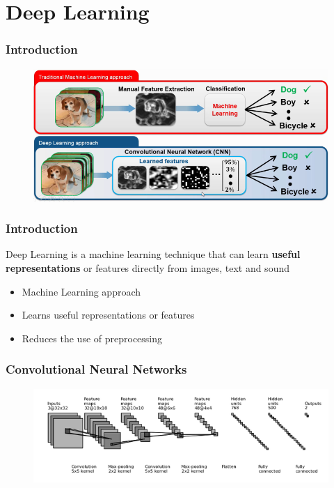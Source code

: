\documentclass[aspectratio=169]{beamer}
\begin{document}
	\section{Deep Learning}
		\begin{frame}
			\frametitle{Introduction}
			
			\begin{figure}
				\includegraphics[scale=0.5]{images/dl_example.png}
			\end{figure}

		\end{frame}
		\begin{frame}
			\frametitle{Introduction}
			
			\begin{block}{}
				Deep Learning is a machine learning technique that can learn \textbf{useful representations} or features directly from images, text and sound
			\end{block}
			
			\begin{itemize}
				\item Machine Learning approach
				\item Learns useful representations or features
				\item Reduces the use of preprocessing
			\end{itemize}

		\end{frame}
		\begin{frame}
			\frametitle{Convolutional Neural Networks}
			
			\begin{figure}
				\includegraphics[width=\linewidth]{images/cnn_example.png}
			\end{figure}
		\end{frame}
\end{document}
